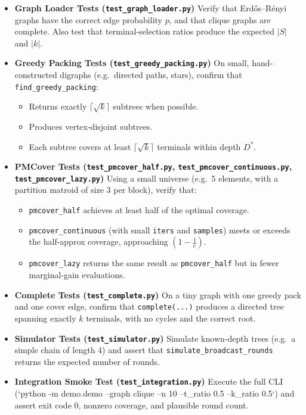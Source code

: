 \documentclass[12pt]{article}
\begin{document}
\begin{itemize}
  \item \textbf{Graph Loader Tests (\texttt{test\_graph\_loader.py})}  
    Verify that Erdős–Rényi graphs have the correct edge probability \(p\), and that clique graphs are complete.  Also test that terminal‐selection ratios produce the expected \(|S|\) and \(|k|\).

  \item \textbf{Greedy Packing Tests (\texttt{test\_greedy\_packing.py})}  
    On small, hand‐constructed digraphs (e.g.\ directed paths, stars), confirm that \texttt{find\_greedy\_packing}:
    \begin{itemize}
      \item Returns exactly \(\lceil\sqrt{k}\rceil\) subtrees when possible.
      \item Produces vertex‐disjoint subtrees.
      \item Each subtree covers at least \(\lceil\sqrt{k}\rceil\) terminals within depth \(D^*\).
    \end{itemize}

  \item \textbf{PMCover Tests (\texttt{test\_pmcover\_half.py}, \texttt{test\_pmcover\_continuous.py}, \texttt{test\_pmcover\_lazy.py})}  
    Using a small universe (e.g.\ 5 elements, with a partition matroid of size 3 per block), verify that:
    \begin{itemize}
      \item \texttt{pmcover\_half} achieves at least half of the optimal coverage.
      \item \texttt{pmcover\_continuous} (with small \texttt{iters} and \texttt{samples}) meets or exceeds the half-approx coverage, approaching \((1-\tfrac1e)\).
      \item \texttt{pmcover\_lazy} returns the same result as \texttt{pmcover\_half} but in fewer marginal‐gain evaluations.
    \end{itemize}

  \item \textbf{Complete Tests (\texttt{test\_complete.py})}  
    On a tiny graph with one greedy pack and one cover edge, confirm that \texttt{complete(...)} produces a directed tree spanning exactly \(k\) terminals, with no cycles and the correct root.

  \item \textbf{Simulator Tests (\texttt{test\_simulator.py})}  
    Simulate known‐depth trees (e.g.\ a simple chain of length 4) and assert that \texttt{simulate\_broadcast\_rounds} returns the expected number of rounds.

  \item \textbf{Integration Smoke Test (\texttt{test\_integration.py})}  
    Execute the full CLI (`python -m demo.demo --graph clique --n 10 --t\_ratio 0.5 --k\_ratio 0.5`) and assert exit code 0, nonzero coverage, and plausible round count.
\end{itemize}
\end{document}
